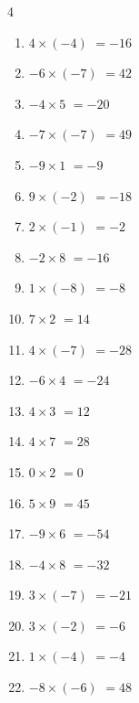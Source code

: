 \begin{multicols}{4}
\begin{enumerate}
  \item $4\times (-4)$
        $=-16$

  \item $-6\times (-7)$
        $=42$

  \item $-4\times 5$
        $=-20$

  \item $-7\times (-7)$
        $=49$

  \item $-9\times 1$
        $=-9$

  \item $9\times (-2)$
        $=-18$

  \item $2\times (-1)$
        $=-2$

  \item $-2\times 8$
        $=-16$

  \item $1\times (-8)$
        $=-8$

  \item $7\times 2$
        $=14$

  \item $4\times (-7)$
        $=-28$

  \item $-6\times 4$
        $=-24$

  \item $4\times 3$
        $=12$

  \item $4\times 7$
        $=28$

\columnbreak %

  \item $0\times 2$
        $=0$

  \item $5\times 9$
        $=45$

  \item $-9\times 6$
        $=-54$

  \item $-4\times 8$
        $=-32$

  \item $3\times (-7)$
        $=-21$

  \item $3\times (-2)$
        $=-6$

  \item $1\times (-4)$
        $=-4$

  \item $-8\times (-6)$
        $=48$


\end{enumerate}
\end{multicols}

